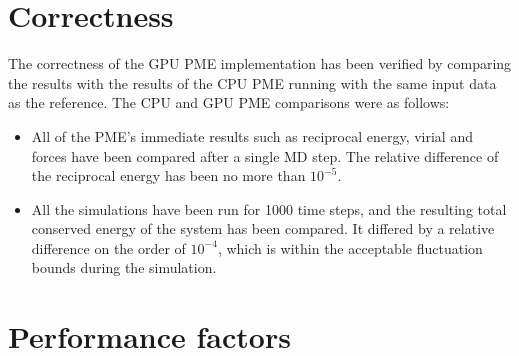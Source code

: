 \documentclass[12pt,a4paper]{report}
\newcommand{\draft}[1]{#1}
\begin{document}
\section{Correctness}
The correctness of the GPU PME implementation has been verified by comparing the results with the results of the CPU PME running with the same input data as the reference.
The CPU and GPU PME comparisons were as follows:
\begin{itemize}
\item All of the PME's immediate results such as reciprocal energy, virial and forces have been compared after a single MD step. The relative difference of the reciprocal energy has been no more than $10^{-5}$. 


\item All the simulations have been run for 1000 time steps, and the resulting total conserved energy of the system has been compared. It differed by a relative difference on the order of $10^{-4}$, which is within the acceptable fluctuation bounds during the simulation.
\end{itemize} 

\section{Performance factors}
\end{document}
